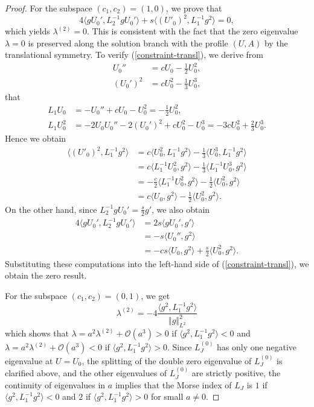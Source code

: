 \documentclass[10pt,a4paper]{amsart}
\begin{document}
\begin{proof}
For the subspace $(c_1,c_2) = (1,0)$, we prove that 
\begin{equation}
    \label{constraint-transl}
4 \langle g U_0', L_2^{-1} g U_0' \rangle + s \langle (U'_0)^2, L_{1}^{-1}g^2 \rangle = 0,
\end{equation}
which yields $\lambda^{(2)} = 0$. This is consistent with the fact that the zero eigenvalue $\lambda = 0$ is 
preserved along the solution branch with the profile $(U,A)$ by the translational symmetry. To verify (\ref{constraint-transl}), we derive from 
\begin{align*}
    U_0'' &= c U_0 - \frac{1}{2} U_0^2, \\
    (U_0')^2 &= c U_0^2 - \frac{1}{3} U_0^3,
\end{align*}
that 
\begin{align*}
    L_1 U_0 &= -U_0'' + c U_0 - U_0^2 = -\frac{1}{2} U_0^2, \\
    L_1 U_0^2 &= -2 U_0 U_0'' - 2 (U_0')^2 + c U_0^2 - U_0^3 = -3 c U_0^2 + \frac{2}{3} U_0^3.
\end{align*}
Hence we obtain 
\begin{align*}
\langle (U'_0)^2, L_{1}^{-1}g^2 \rangle &= c \langle U_0^2, L_{1}^{-1}g^2 \rangle - \frac{1}{3} \langle U_0^3, L_{1}^{-1}g^2 \rangle\\
 &= c \langle L_{1}^{-1} U_0^2, g^2 \rangle - \frac{1}{3} \langle L_{1}^{-1} U_0^3, g^2 \rangle\\
  &= -\frac{c}{2} \langle L_{1}^{-1} U_0^2, g^2 \rangle - \frac{1}{2} \langle U_0^2, g^2 \rangle\\
    &= c \langle U_0, g^2 \rangle - \frac{1}{2} \langle U_0^2, g^2 \rangle.
\end{align*}
On the other hand, since $L_2^{-1} g U_0' = \frac{s}{2} g'$, we also obtain 
\begin{align*}
4 \langle g U_0', L_2^{-1} g U_0' \rangle &= 2 s \langle g U_0', g' \rangle \\
 &= - s \langle U_0'', g^2 \rangle \\
  &= -c s  \langle U_0, g^2 \rangle + \frac{s}{2} \langle U_0^2, g^2 \rangle.
\end{align*}
Substituting these computations into the left-hand side of (\ref{constraint-transl}), we obtain the zero result.

For the subspace $(c_1,c_2) = (0,1)$, we get 
\[
\lambda^{(2)}=-4\frac{\langle g^2,L_{1}^{-1}g^2\rangle}{\Vert g\Vert^2_{L^2}}
\]
which shows that $\lambda = a^2 \lambda^{(2)} + \mathcal{O}(a^3) > 0$ if $\langle g^2,L_{1}^{-1}g^2\rangle < 0$ and $\lambda = a^2 \lambda^{(2)} + \mathcal{O}(a^3) < 0$ if $\langle g^2,L_{1}^{-1}g^2\rangle > 0$. Since $L_J^{(0)}$ has only one negative eigenvalue at $U = U_0$, the splitting of the double zero eigenvalue 
of $L_J^{(0)}$ is clarified above, and the other eigenvalues of $L_J^{(0)}$ are strictly positive, the continuity of eigenvalues in $a$ implies that the Morse index of $L_J$ is $1$ if $\langle g^2,L_{1}^{-1}g^2\rangle < 0$ and $2$ if $\langle g^2,L_{1}^{-1}g^2\rangle > 0$ for small $a \neq 0$. 


\end{proof}
\end{document}
